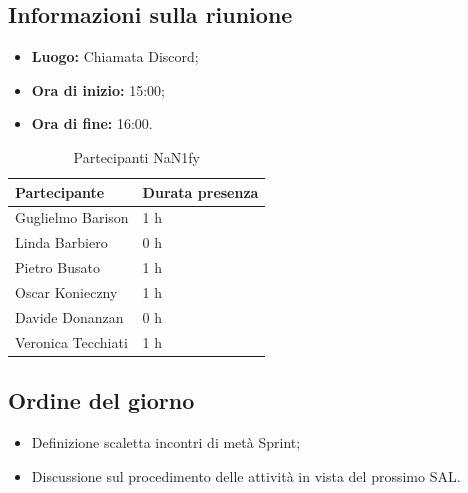\documentclass[8pt]{article}
\begin{document}
\subsection{Informazioni sulla riunione}
\begin{itemize}
	\setlength\itemsep{0em}
	\item\textbf{Luogo:} Chiamata Discord;
	\item\textbf{Ora di inizio:} 15:00;
	\item\textbf{Ora di fine:}  16:00.
\end{itemize}
\begin{table}[ht!]
	\begin{minipage}[t]{0.5\linewidth}
		\centering
		\begin{tabular}{p{3cm} p{3cm}}
			\toprule
			\textbf{Partecipante} & \textbf{Durata presenza} \\
			\midrule
			Guglielmo Barison & 1 h \\
			Linda Barbiero &  0 h \\
			Pietro Busato & 1 h \\
			Oscar Konieczny & 1 h \\
			Davide Donanzan & 0 h \\
			Veronica Tecchiati & 1 h \\
			\bottomrule
		\end{tabular}
		\caption{Partecipanti NaN1fy}
		\label{table:Partecipanti NaN1fy}
	\end{minipage}
\end{table}
\subsection{Ordine del giorno}
\begin{itemize}
	\setlength\itemsep{0em}
    \item Definizione scaletta incontri di metà Sprint;
	\item Discussione sul procedimento delle attività in vista del prossimo SAL.
\end{itemize}
\end{document}

